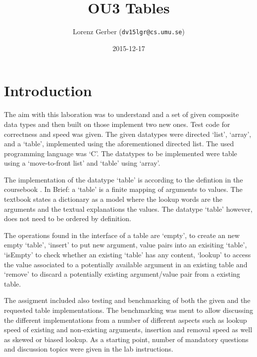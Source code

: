 \documentclass[a4paper,11pt,twoside]{article}
\title{OU3 Tables}
\author{Lorenz Gerber  ({\tt{dv15lgr@cs.umu.se}})}
\date{2015-12-17}
\begin{document}
\maketitle

\tableofcontents
\newpage

\section{Introduction} 
The aim with this laboration was to understand and a set of given 
composite data types and then built on those implement two new ones.
Test code for correctness and speed was given. The given datatypes
were directed `list', `array', and a `table', implemented using the 
aforementioned directed list. The used programming language was `C'. 
The datatypes to be implemented were table using a `move-to-front 
list' and `table' using `array'.

The implementation of the datatype `table' is according to the 
defintion in the coursebook \cite[po. 117 -- 132]{janlert2000}. In Brief:
a `table' is a finite mapping of arguments to values. The textbook states 
a dictionary as a model where the lookup words are the arguments and the
textual explanations the values. The datatype `table' however, does not 
need to be ordered by definition.

The operations found in the interface of a table are `empty', to create
an new empty `table', `insert' to put new argument, value pairs into an 
exisiting `table', `isEmpty' to check whether an existing `table' has any
content, `lookup' to access the value associated to a potentially available
argument in an existing table and `remove' to discard a potentially
existing argument/value pair from a existing table.  

The assigment included also testing and benchmarking of both the given and
the requested table implementations. The benchmarking was ment to
allow discussing the different implementations from a number of different
aspects such as lookup speed of existing and non-existing arguments, insertion
and removal speed as well as skewed or biased lookup. As a starting point,
number of mandatory questions and discussion topics were given in the
lab instructions.  
\end{document}
